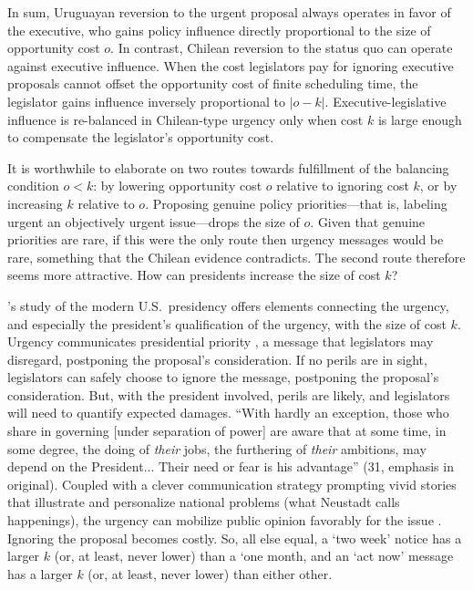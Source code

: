 \documentclass[letter,12pt]{article}
\begin{document}
In sum, Uruguayan reversion to the urgent proposal always operates in favor of the executive, who gains policy influence directly proportional to the size of opportunity cost $o$. In contrast, Chilean reversion to the status quo can operate against executive influence. When the cost legislators pay for ignoring executive proposals cannot offset the opportunity cost of finite scheduling time, the legislator gains influence inversely proportional to $|o-k|$. Executive-legislative influence is re-balanced in Chilean-type urgency only when cost $k$ is large enough to compensate the legislator's opportunity cost. 

It is worthwhile to elaborate on two routes towards fulfillment of the balancing condition $o<k$: by lowering opportunity cost $o$ relative to ignoring cost $k$, or by increasing $k$ relative to $o$. Proposing genuine policy priorities---that is, labeling urgent an objectively urgent issue---drops the size of $o$. Given that genuine priorities are rare, if this were the only route then urgency messages would be rare, something that the Chilean evidence contradicts. The second route therefore seems more attractive. How can presidents increase the size of cost $k$?

\citeauthor{neustadt.1990}'s \citeyearpar{neustadt.1990} study of the modern U.S.\ presidency offers elements connecting the urgency, and especially the president's qualification of the urgency, with the size of cost $k$. Urgency communicates presidential priority \citep{aleman.navia.UrgChi.2009}, a message that legislators may disregard, postponing the proposal's consideration. If no perils are in sight, legislators can safely choose to ignore the message, postponing the proposal's consideration. But, with the president involved, perils are likely, and legislators will need to quantify expected damages. ``With hardly an exception, those who share in governing [under separation of power] are aware that at some time, in some degree, the doing of \emph{their} jobs, the furthering of \emph{their} ambitions, may depend on the President... Their need or fear is his advantage'' (31, emphasis in original). Coupled with a clever communication strategy prompting vivid stories that illustrate and personalize national problems (what Neustadt calls happenings), the urgency can mobilize public opinion favorably for the issue \citep{iyengar.kinderNewsMatter1987}. Ignoring the proposal becomes costly. So, all else equal, a `two week' notice has a larger $k$ (or, at least, never lower) than a `one month, and an `act now' message has a larger $k$ (or, at least, never lower) than either other. 
\end{document}
